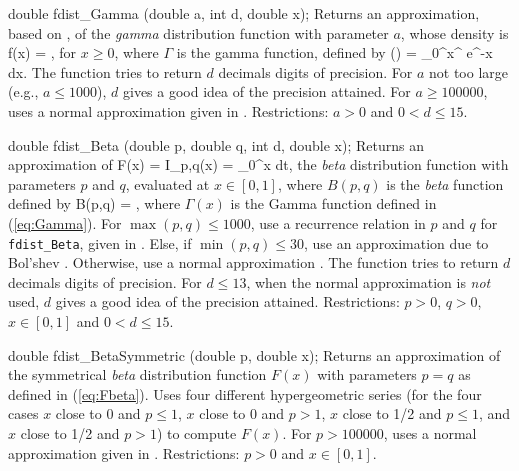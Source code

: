 double fdist_Gamma (double a, int d, double x);
\endcode
  \tab
  Returns an approximation, based on \cite{tBAT70a}, of the {\em gamma\/}
  distribution function with  parameter $a$, whose density is
  \eq
    f(x) = ,
  \endeq
  for $x\ge 0$, where $\Gamma$ is the gamma function, defined by
  \eq
    \Gamma(\alpha) = \int_0^\infty x^{} e^{-x} dx.
                                                       \label{eq:Gamma}
  \endeq
  The function tries to return $d$ decimals digits of precision.
  For $a$ not too large (e.g., $a \le 1000$),
  $d$ gives a good idea of the precision attained.
  For $a \ge 100000$, uses a normal approximation given in \cite{tPEI68a}.
   Restrictions:  $a>0$ and  $0 < d \le 15$.
  \endtab
\code


double fdist_Beta (double p, double q, int d, double x);
\endcode
  \tab
  Returns an approximation of
  \eq
    F(x) = I_{p,q}(x)
         = \int_0^x  dt,
  \endeq
  the {\em beta\/} distribution function with parameters $p$ and $q$,
  evaluated at $x \in [0, 1]$, where $B(p,q)$ is the {\em beta\/} function
  defined by
  \eq
    B(p,q) = ,
  \endeq
  where $\Gamma (x)$ is the Gamma function defined in (\ref{eq:Gamma}).
  For $\max(p, q) \le 1000$, use a recurrence relation in $p$ and $q$ for
  {\tt fdist\_Beta}, given in \cite{tGAU64a,tGAU64b}.
  Else, if $\min(p, q) \le 30$,
  use an approximation due to Bol'shev \cite{tMAR78a}.  Otherwise, use a
  normal approximation \cite{tPEI68a}.
  The function tries to return $d$ decimals digits of precision.
  For $d\le 13$, when the normal approximation is {\em not\/} used,
  $d$ gives a good idea of the precision attained.
  Restrictions:  $p>0$,  $q>0$, $x \in [0, 1]$ and $0 < d \le 15$.
  \endtab
\code


double fdist_BetaSymmetric (double p, double x);
\endcode
  \tab
  Returns an approximation of the symmetrical {\em beta\/} distribution
  function $F(x)$ with parameters $p = q$  as defined in (\ref{eq:Fbeta}).
  Uses four different hypergeometric series
  (for the four cases $x$ close to 0 and $p \le 1$,
     $x$ close to 0 and $p > 1$,  $x$ close to 1/2 and $p \le 1$,
  and  $x$ close to 1/2 and $p > 1$)
  to compute $F(x)$.
  For $p > 100000$, uses a normal approximation given in \cite{tPEI68a}.
  Restrictions:  $p>0$ and $x \in [0, 1]$.
  \endtab
\code


